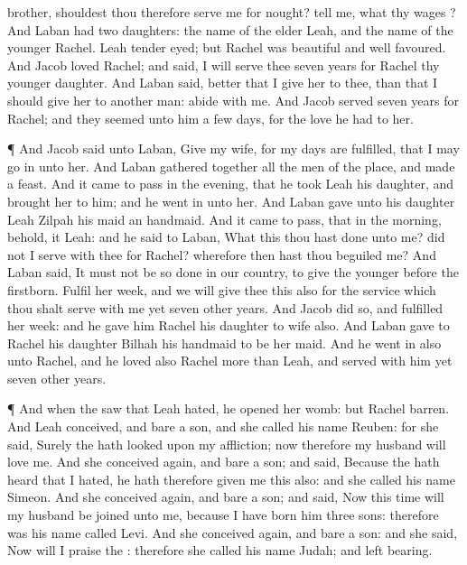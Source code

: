 {brother, shouldest thou therefore
serve me for
nought?
tell me, what
{} thy
wages
{}?
And
Laban had
two
daughters: the
name of the
elder
{}
Leah, and the
name of the
younger
{}
Rachel.
Leah
{}
tender
eyed; but
Rachel was
beautiful and
well
favoured.
And
Jacob
loved
Rachel; and
said, I will
serve thee
seven
years for
Rachel thy
younger
daughter.
And
Laban
said,
{}
better that I
give her to thee, than that I should
give her to
another
man:
abide with me.
And
Jacob
served
seven
years for
Rachel; and they
seemed unto him
{} a
few
days, for the love he
had to her.
\par }{\PP {}¶ And
Jacob
said unto
Laban,
Give
{} my
wife, for my
days are
fulfilled, that I may go
in unto her.
And
Laban gathered
together all the
men of the
place, and
made a
feast.
And it came to pass in the
evening, that he
took
Leah his
daughter, and
brought her to him; and he went
in unto her.
And
Laban
gave unto his
daughter
Leah
Zilpah his
maid
{} an
handmaid.
And it came to pass, that in the
morning, behold, it
{}
Leah: and he
said to
Laban, What
{} this thou hast
done unto me? did not I
serve with thee for
Rachel? wherefore then hast thou
beguiled me?
And
Laban
said, It must not be so
done in our
country, to
give the
younger
before the
firstborn.
Fulfil
her
week, and we will
give thee this also for the
service which thou shalt
serve with me yet
seven
other
years.
And
Jacob
did so, and
fulfilled her
week: and he
gave him
Rachel his
daughter to
wife also.
And
Laban
gave to
Rachel his
daughter
Bilhah his
handmaid to be her
maid.
And he went
in also unto
Rachel, and he
loved also
Rachel more than
Leah, and
served with him yet
seven
other
years.
\par }{\PP {}¶ And when the
{}
saw that
Leah
{}
hated, he
opened her
womb: but
Rachel
{}
barren.
And
Leah
conceived, and
bare a
son, and she
called his
name
Reuben:
for she
said,
Surely the
{} hath
looked upon my
affliction; now
therefore my
husband will
love me.
And she
conceived again, and
bare a
son; and
said, Because the
{} hath
heard that I
{}
hated, he hath therefore
given me this
{} also: and she
called his
name
Simeon.
And she conceived
again, and
bare a
son; and
said, Now this
time will my
husband be
joined unto me, because I have
born him
three
sons: therefore was his
name
called
Levi.
And she
conceived again, and
bare a
son: and she
said,
Now will I
praise the
{}: therefore she
called his
name
Judah; and
left
bearing.

}
